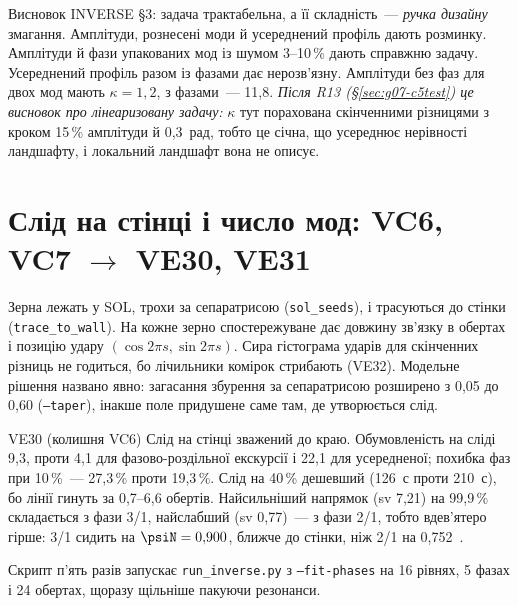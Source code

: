 Висновок INVERSE §3: задача трактабельна, а її складність~--- \emph{ручка дизайну} змагання. Амплітуди, рознесені моди й усереднений профіль дають розминку. Амплітуди й фази упакованих мод із шумом 3--10\,\% дають справжню задачу. Усереднений профіль разом із фазами дає нерозв'язну. Амплітуди без фаз для двох мод мають $\kappa=1{,}2$, з фазами~--- 11,8. \emph{Після R13 (\S\ref{sec:g07-c5test}) це висновок про лінеаризовану задачу:} $\kappa$ тут порахована скінченними різницями з кроком 15\,\% амплітуди й 0,3~рад, тобто це січна, що усереднює нерівності ландшафту, і локальний ландшафт вона не описує.

\section{Слід на стінці і число мод: VC6, VC7 \texorpdfstring{$\to$}{→} VE30, VE31}\label{sec:g07-campaign}


Зерна лежать у SOL, трохи за сепаратрисою (\texttt{sol\_seeds}), і трасуються до стінки (\texttt{trace\_to\_wall}). На кожне зерно спостережуване дає довжину зв'язку в обертах і позицію удару $(\cos2\pi s,\sin2\pi s)$. Сира гістограма ударів для скінченних різниць не годиться, бо лічильники комірок стрибають (VE32). Модельне рішення названо явно: загасання збурення за сепаратрисою розширено з 0,05 до 0,60 (\texttt{--taper}), інакше поле придушене саме там, де утворюється слід.

\begin{established}{VE30 (колишня VC6)}
Слід на стінці зважений до краю. Обумовленість на сліді 9,3, проти 4,1 для фазово-роздільної екскурсії і 22,1 для усередненої; похибка фаз при 10\,\%~--- 27,3\,\% проти 19,3\,\%. Слід на 40\,\% дешевший (126~с проти 210~с), бо лінії гинуть за 0,7--6,6 обертів. Найсильніший напрямок (sv 7,21) на 99,9\,\% складається з фази 3/1, найслабший (sv 0,77)~--- з фази 2/1, тобто вдев'ятеро гірше: 3/1 сидить на $\psiN=0{,}900$, ближче до стінки, ніж 2/1 на 0,752~\cite{RegViz,g07Campaign}.
\end{established}


Скрипт п'ять разів запускає \texttt{run\_inverse.py} з \texttt{--fit-phases} на 16 рівнях, 5 фазах і 24 обертах, щоразу щільніше пакуючи резонанси.

